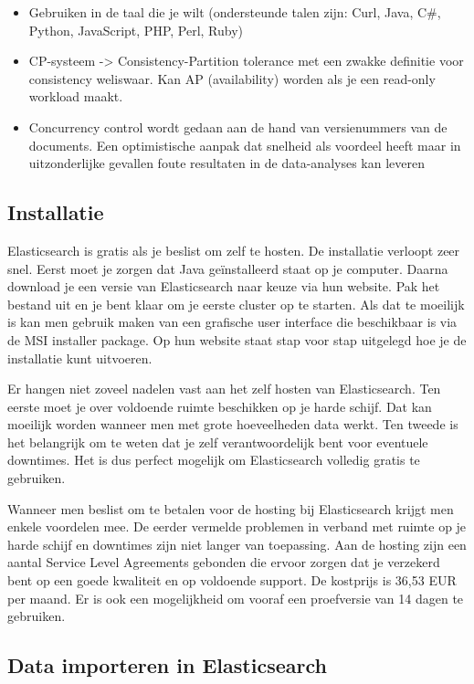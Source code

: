 {\begin{itemize}
	\item Gebruiken in de taal die je wilt (ondersteunde talen zijn: Curl, Java, C\#, Python, JavaScript, PHP, Perl, Ruby)
	
	\item CP-systeem -> Consistency-Partition tolerance met een zwakke definitie voor consistency weliswaar. 
	Kan AP (availability) worden als je een read-only workload maakt. 
	
	\item Concurrency control wordt gedaan aan de hand van versienummers van de documents. Een optimistische aanpak dat snelheid als voordeel heeft maar in uitzonderlijke gevallen foute resultaten in de data-analyses kan leveren 
\end{itemize}

\subsection{Installatie}
\label{Installatie}

Elasticsearch is gratis als je beslist om zelf te hosten. De installatie verloopt zeer snel. Eerst moet je zorgen dat Java geïnstalleerd staat op je computer. Daarna download je een versie van Elasticsearch naar keuze via hun website. Pak het bestand uit en je bent klaar om je eerste cluster op te starten. Als dat te moeilijk is kan men gebruik maken van een grafische user interface die beschikbaar is via de MSI installer package. Op hun website staat stap voor stap uitgelegd hoe je de installatie kunt uitvoeren. 

Er hangen niet zoveel nadelen vast aan het zelf hosten van Elasticsearch. Ten eerste moet je over voldoende ruimte beschikken op je harde schijf. Dat kan moeilijk worden wanneer men met grote hoeveelheden data werkt. Ten tweede is het belangrijk om te weten dat je zelf verantwoordelijk bent voor eventuele downtimes. Het is dus perfect mogelijk om Elasticsearch volledig gratis te gebruiken. 

Wanneer men beslist om te betalen voor de hosting bij Elasticsearch krijgt men enkele voordelen mee. De eerder vermelde problemen in verband met ruimte op je harde schijf en downtimes zijn niet langer van toepassing.  Aan de hosting zijn een aantal Service Level Agreements gebonden die ervoor zorgen dat je verzekerd bent op een goede kwaliteit en op voldoende support. De kostprijs is 36,53 EUR per maand. Er is ook een mogelijkheid om vooraf een proefversie van 14 dagen te gebruiken.

\subsection{Data importeren in Elasticsearch}

}

